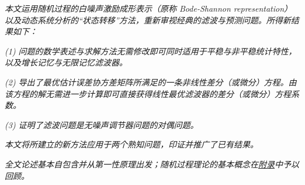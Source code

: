 \emph{本文运用随机过程的白噪声激励成形表示（原称 Bode-Shannon representation）以及动态系统分析的“状态转移”方法，重新审视经典的滤波与预测问题。所得新结果如下：}

\emph{(1) 问题的数学表述与求解方法无需修改即可同时适用于平稳与非平稳统计特性，以及增长记忆与无限记忆滤波器。}

\emph{(2) 导出了最优估计误差协方差矩阵所满足的一条非线性差分（或微分）方程。由该方程的解无需进一步计算即可直接获得线性最优滤波器的差分（或微分）方程系数。}

\emph{(3) 证明了滤波问题是无噪声调节器问题的对偶问题。}

\emph{本文将所建立的新方法应用于两个熟知问题，印证并推广了已有结果。}

\emph{全文论述基本自包含并从第一性原理出发；随机过程理论的基本概念在\hyperref[sec:appendix]{附录}中予以回顾。}
